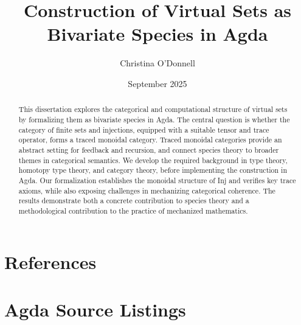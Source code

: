 \documentclass[4pt,a4paper]{report}
\title{Construction of Virtual Sets as Bivariate Species in Agda}
\author{Christina O'Donnell}
\date{September 2025}
\begin{document}
\maketitle
\begin{abstract}
  This dissertation explores the categorical and computational structure of
  virtual sets by formalizing them as bivariate species in Agda. The central
  question is whether the category of finite sets and injections, equipped
  with a suitable tensor and trace operator, forms a traced monoidal category.
  Traced monoidal categories provide an abstract setting for feedback and
  recursion, and connect species theory to broader themes in categorical
  semantics. We develop the required background in type theory, homotopy type
  theory, and category theory, before implementing the construction in Agda.
  Our formalization establishes the monoidal structure of Inj and verifies key
  trace axioms, while also exposing challenges in mechanizing categorical
  coherence. The results demonstrate both a concrete contribution to species
  theory and a methodological contribution to the practice of mechanized
  mathematics.
\end{abstract}
\tableofcontents
\listoffigures
\listoftables






\appendix
\chapter{References}


\chapter{Agda Source Listings}
\end{document}
